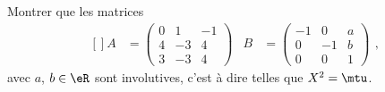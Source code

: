 \begin{exercice}\label{exoLineraire0007}

Montrer que les matrices
\begin{equation}
	\begin{aligned}[]
		A&=\begin{pmatrix}
  0	&	1	&	-1\\ 
  4	&	-3	&	4\\ 
 3	&	-3	& 4	  
\end{pmatrix}
	&B&=\begin{pmatrix}
  -1	&	0	&	a\\ 
  0	&	-1	&	b\\ 
 0	&	0	& 1	  
\end{pmatrix}
	\end{aligned},
\end{equation}
avec $a$, $b\in\eR$ sont involutives, c'est à dire telles que $X^2=\mtu$.


\end{exercice}
